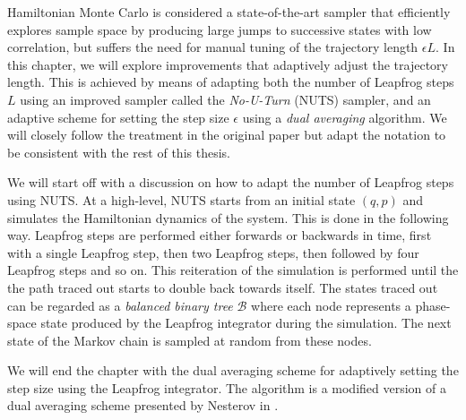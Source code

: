 Hamiltonian Monte Carlo is considered a state-of-the-art sampler that efficiently explores sample space by producing large jumps to successive states with low correlation, 
but suffers the need for manual tuning of the trajectory length $\epsilon L$. 
In this chapter, we will explore improvements that adaptively adjust the trajectory length. This is achieved by means of adapting both the number of Leapfrog steps $L$ using an improved sampler called the \textit{No-U-Turn} (NUTS) sampler, and an adaptive scheme for setting the step size $\epsilon$ using a \textit{dual averaging} algorithm. We will closely follow the treatment in the original paper \cite{nuts} but adapt the notation to be consistent with the rest of this thesis.

We will start off with a discussion on how to adapt the number of Leapfrog steps using NUTS. At a high-level, NUTS starts from an initial state $(q, p)$ and simulates the Hamiltonian dynamics of the system. This is
done in the following way. Leapfrog steps are performed either forwards or backwards in time, first with a single Leapfrog step, then two Leapfrog steps, then followed by four Leapfrog steps and so on. This reiteration of the simulation is performed until the the path traced out starts to double back towards itself. The states traced out can be regarded as a \textit{balanced binary tree} $\mathcal{B}$ where
each node represents a phase-space state produced by the Leapfrog integrator during the simulation. The next state of the Markov chain is sampled at random from these nodes.  

We will end the chapter with the dual averaging scheme for adaptively setting the step size using the Leapfrog integrator. The algorithm is a modified version of a dual averaging scheme presented by Nesterov in \cite{Nesterov2009}.


